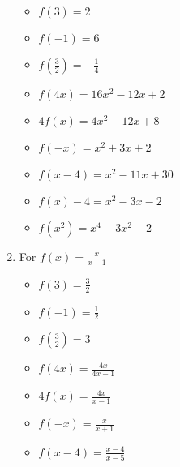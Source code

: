 \begin{enumerate}
\begin{multicols}{3}
\begin{itemize}
\item $f(3) = 2$
\item $f(-1) = 6$
\item $f\left(\frac{3}{2} \right) = -\frac{1}{4}$
\end{itemize}
\end{multicols}

\begin{multicols}{3}
\begin{itemize}
\item  $f(4x) = 16x^2-12x+2$
\item $4f(x) = 4x^2-12x+8$
\item $f(-x) = x^2+3x+2$
\end{itemize}
\end{multicols}

\begin{multicols}{3}
\begin{itemize}
\item  $f(x-4) = x^2-11x+30$
\item $f(x) - 4 = x^2-3x-2$
\item  $f\left(x^2\right) = x^4-3x^2+2$
\end{itemize}
\end{multicols}


\item For $f(x) = \frac{x}{x-1}$ 

\begin{multicols}{3}
\begin{itemize}
\item $f(3) = \frac{3}{2}$
\item $f(-1) = \frac{1}{2}$
\item $f\left(\frac{3}{2} \right) = 3$
\end{itemize}
\end{multicols}

\begin{multicols}{3}
\begin{itemize}
\item  $f(4x) = \frac{4x}{4x-1}$
\item $4f(x) = \frac{4x}{x-1}$
\item $f(-x) = \frac{x}{x+1}$
\end{itemize}
\end{multicols}

\begin{multicols}{3}
\begin{itemize}
\item  $f(x-4) = \frac{x-4}{x-5}$


\end{itemize}
\end{multicols}
\end{enumerate}
